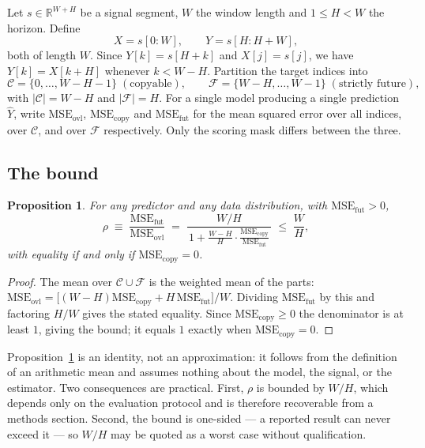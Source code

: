 \documentclass{article}
\newtheorem{proposition}{Proposition}
\newcommand{\MSEo}{\mathrm{MSE}_{\mathrm{ovl}}}
\newcommand{\MSEc}{\mathrm{MSE}_{\mathrm{copy}}}
\newcommand{\MSEf}{\mathrm{MSE}_{\mathrm{fut}}}
\begin{document}
Let $s \in \mathbb{R}^{W+H}$ be a signal segment, $W$ the window length and
$1\le H<W$ the horizon. Define
\begin{equation}
X = s[0{:}W], \qquad Y = s[H{:}H{+}W],
\end{equation}
both of length $W$. Since $Y[k]=s[H+k]$ and $X[j]=s[j]$, we have $Y[k]=X[k{+}H]$
whenever $k<W-H$. Partition the target indices into
\begin{equation}
\mathcal{C}=\{0,\dots,W{-}H{-}1\} \;(\text{copyable}), \qquad
\mathcal{F}=\{W{-}H,\dots,W{-}1\} \;(\text{strictly future}),
\end{equation}
with $|\mathcal{C}|=W-H$ and $|\mathcal{F}|=H$. For a single model producing a
single prediction $\hat{Y}$, write $\MSEo$, $\MSEc$ and $\MSEf$ for the mean
squared error over all indices, over $\mathcal{C}$, and over $\mathcal{F}$
respectively. Only the scoring mask differs between the three.

\subsection{The bound}

\begin{proposition}\label{prop:law}
For any predictor and any data distribution, with $\MSEf>0$,
\begin{equation}
\rho \;\equiv\; \frac{\MSEf}{\MSEo}
\;=\; \frac{W/H}{\,1+\frac{W-H}{H}\cdot\frac{\MSEc}{\MSEf}\,}
\;\le\; \frac{W}{H},
\label{eq:law}
\end{equation}
with equality if and only if $\MSEc=0$.
\end{proposition}

\begin{proof}
The mean over $\mathcal{C}\cup\mathcal{F}$ is the weighted mean of the parts:
$\MSEo = \bigl[(W{-}H)\MSEc + H\,\MSEf\bigr]/W$. Dividing $\MSEf$ by this and
factoring $H/W$ gives the stated equality. Since $\MSEc\ge0$ the denominator is at
least $1$, giving the bound; it equals $1$ exactly when $\MSEc=0$.
\end{proof}

Proposition~\ref{prop:law} is an identity, not an approximation: it follows from
the definition of an arithmetic mean and assumes nothing about the model, the
signal, or the estimator. Two consequences are practical. First, $\rho$ is bounded
by $W/H$, which depends only on the evaluation protocol and is therefore
recoverable from a methods section. Second, the bound is one-sided --- a reported
result can never exceed it --- so $W/H$ may be quoted as a worst case without
qualification.
\end{document}
